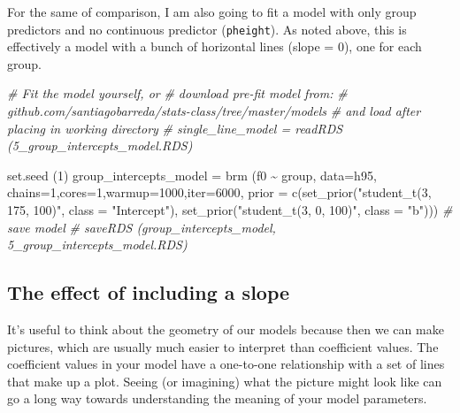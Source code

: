 \documentclass[
]{book}
\newenvironment{Shaded}{\begin{snugshade}}{\end{snugshade}}
\newcommand{\AttributeTok}[1]{\textcolor[rgb]{0.77,0.63,0.00}{#1}}
\newcommand{\CommentTok}[1]{\textcolor[rgb]{0.56,0.35,0.01}{\textit{#1}}}
\newcommand{\DecValTok}[1]{\textcolor[rgb]{0.00,0.00,0.81}{#1}}
\newcommand{\FunctionTok}[1]{\textcolor[rgb]{0.00,0.00,0.00}{#1}}
\newcommand{\NormalTok}[1]{#1}
\newcommand{\OtherTok}[1]{\textcolor[rgb]{0.56,0.35,0.01}{#1}}
\newcommand{\SpecialCharTok}[1]{\textcolor[rgb]{0.00,0.00,0.00}{#1}}
\newcommand{\StringTok}[1]{\textcolor[rgb]{0.31,0.60,0.02}{#1}}
\begin{document}
For the same of comparison, I am also going to fit a model with only group predictors and no continuous predictor (\texttt{pheight}). As noted above, this is effectively a model with a bunch of horizontal lines (slope = 0), one for each group.

\begin{Shaded}
\begin{Highlighting}[]
\CommentTok{\# Fit the model yourself, or}
\CommentTok{\# download pre{-}fit model from: }
\CommentTok{\# github.com/santiagobarreda/stats{-}class/tree/master/models}
\CommentTok{\# and load after placing in working directory}
\CommentTok{\# single\_line\_model = readRDS (\textquotesingle{}5\_group\_intercepts\_model.RDS\textquotesingle{})}

\FunctionTok{set.seed}\NormalTok{ (}\DecValTok{1}\NormalTok{)}
\NormalTok{group\_intercepts\_model }\OtherTok{=}
  \FunctionTok{brm}\NormalTok{ (f0 }\SpecialCharTok{\textasciitilde{}}\NormalTok{ group, }\AttributeTok{data=}\NormalTok{h95, }\AttributeTok{chains=}\DecValTok{1}\NormalTok{,}\AttributeTok{cores=}\DecValTok{1}\NormalTok{,}\AttributeTok{warmup=}\DecValTok{1000}\NormalTok{,}\AttributeTok{iter=}\DecValTok{6000}\NormalTok{,}
       \AttributeTok{prior =} \FunctionTok{c}\NormalTok{(}\FunctionTok{set\_prior}\NormalTok{(}\StringTok{"student\_t(3, 175, 100)"}\NormalTok{, }\AttributeTok{class =} \StringTok{"Intercept"}\NormalTok{),}
                 \FunctionTok{set\_prior}\NormalTok{(}\StringTok{"student\_t(3, 0, 100)"}\NormalTok{, }\AttributeTok{class =} \StringTok{"b"}\NormalTok{)))}
\CommentTok{\# save model}
\CommentTok{\# saveRDS (group\_intercepts\_model, \textquotesingle{}5\_group\_intercepts\_model.RDS\textquotesingle{})}
\end{Highlighting}
\end{Shaded}

\hypertarget{the-effect-of-including-a-slope}{%
\subsection{The effect of including a slope}\label{the-effect-of-including-a-slope}}

It's useful to think about the geometry of our models because then we can make pictures, which are usually much easier to interpret than coefficient values. The coefficient values in your model have a one-to-one relationship with a set of lines that make up a plot. Seeing (or imagining) what the picture might look like can go a long way towards understanding the meaning of your model parameters.
\end{document}
